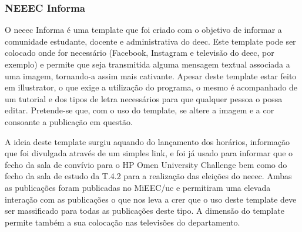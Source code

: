 
\subsubsection{NEEEC Informa}

O \acrshort{neeec} Informa é uma template que foi criado com o objetivo de informar a comunidade estudante, docente e administrativa do \acrshort{deec}. Este template pode ser colocado onde for necessário (Facebook, Instagram e televisão do \acrshort{deec}, por exemplo) e permite que seja transmitida alguma mensagem textual associada a uma imagem, tornando-a assim mais cativante. Apesar deste template estar feito em illustrator, o que exige a utilização do programa, o mesmo é acompanhado de um tutorial e dos tipos de letra necessários para que qualquer pessoa o possa editar. Pretende-se que, com o uso do template, se altere a imagem e a cor consoante a publicação em questão.

A ideia deste template surgiu aquando do lançamento dos horários, informação que foi divulgada através de um simples link, e foi já usado para informar que o fecho da sala de convívio para o HP Omen University Challenge bem como do fecho da sala de estudo da T.4.2 para a realização das eleições do \acrshort{neeec}. Ambas as publicações foram publicadas no MiEEC/\acrshort{uc} e permitiram uma elevada interação com as publicações o que nos leva a crer que o uso deste template deve ser massificado para todas as publicações deste tipo. A dimensão do template permite também a sua colocação nas televisões do departamento.